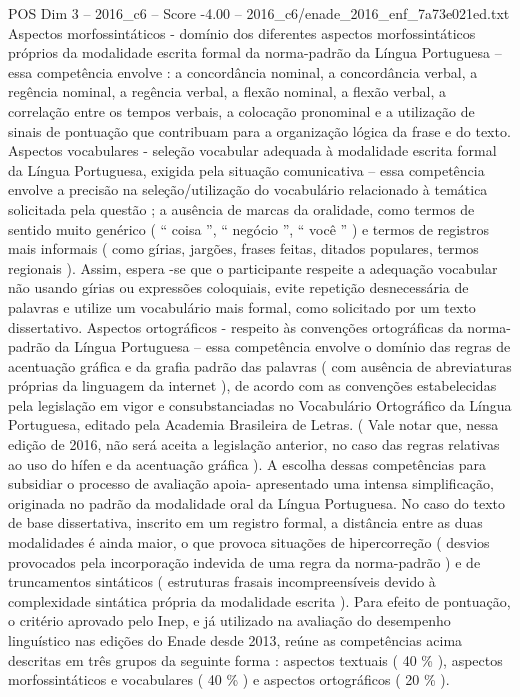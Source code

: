 \begin{textsample}{POS Dim 3 – 2016\_c6 – Score -4.00 – 2016\_c6/enade\_2016\_enf\_7a73e021ed.txt}
Aspectos morfossintáticos - domínio dos diferentes aspectos morfossintáticos próprios da modalidade escrita formal da norma-padrão da Língua Portuguesa – essa competência envolve : a concordância nominal, a concordância verbal, a regência nominal, a regência verbal, a flexão nominal, a flexão verbal, a correlação entre os tempos verbais, a colocação pronominal e a utilização de sinais de pontuação que contribuam para a organização lógica da frase e do texto.
Aspectos vocabulares - seleção vocabular adequada à modalidade escrita formal da Língua Portuguesa, exigida pela situação comunicativa – essa competência envolve a precisão na seleção/utilização do vocabulário relacionado à temática solicitada pela questão ; a ausência de marcas da oralidade, como termos de sentido muito genérico ( “ coisa ”, “ negócio ”, “ você ” ) e termos de registros mais informais ( como gírias, jargões, frases feitas, ditados populares, termos regionais ).
Assim, espera -se que o participante respeite a adequação vocabular não usando gírias ou expressões coloquiais, evite repetição desnecessária de palavras e utilize um vocabulário mais formal, como solicitado por um texto dissertativo.
Aspectos ortográficos - respeito às convenções ortográficas da norma-padrão da Língua Portuguesa – essa competência envolve o domínio das regras de acentuação gráfica e da grafia padrão das palavras ( com ausência de abreviaturas próprias da linguagem da internet ), de acordo com as convenções estabelecidas pela legislação em vigor e consubstanciadas no Vocabulário Ortográfico da Língua Portuguesa, editado pela Academia Brasileira de Letras. ( Vale notar que, nessa edição de 2016, não será aceita a legislação anterior, no caso das regras relativas ao uso do hífen e da acentuação gráfica ).
A escolha dessas competências para subsidiar o processo de avaliação apoia- apresentado uma intensa simplificação, originada no padrão da modalidade oral da Língua Portuguesa.
No caso do texto de base dissertativa, inscrito em um registro formal, a distância entre as duas modalidades é ainda maior, o que provoca situações de hipercorreção ( desvios provocados pela incorporação indevida de uma regra da norma-padrão ) e de truncamentos sintáticos ( estruturas frasais incompreensíveis devido à complexidade sintática própria da modalidade escrita ).
Para efeito de pontuação, o critério aprovado pelo Inep, e já utilizado na avaliação do desempenho linguístico nas edições do Enade desde 2013, reúne as competências acima descritas em três grupos da seguinte forma : aspectos textuais ( 40 \% ), aspectos morfossintáticos e vocabulares ( 40 \% ) e aspectos ortográficos ( 20 \% ).

\end{textsample}
